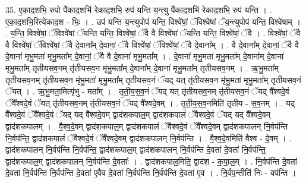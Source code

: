 \documentclass[17pt]{extarticle}
\begin{document}
35. ए॒का॒द॒शभि॒ रुपो पै॑काद॒शभि॑ रेकाद॒शभि॒ रुप॑ यन्ति य॒न्त्यु पै॑काद॒शभि॑ रेकाद॒शभि॒ रुप॑ यन्ति । . ए॒का॒द॒शभि॒रित्ये॑काद॒श - भिः॒ । . उप॑ यन्ति य॒न्त्युपोप॑ यन्ति॒ विश्वे॑षां॒ ॅविश्वे॑षां ॅय॒न्त्युपोप॑ यन्ति॒ विश्वे॑षाम् । . य॒न्ति॒ विश्वे॑षां॒ ॅविश्वे॑षां ॅयन्ति यन्ति॒ विश्वे॑षां॒ ॅवै वै विश्वे॑षां ॅयन्ति यन्ति॒ विश्वे॑षां॒ ॅवै । . विश्वे॑षां॒ ॅवै वै विश्वे॑षां॒ ॅविश्वे॑षां॒ ॅवै दे॒वाना᳚म् दे॒वानां॒ ॅवै विश्वे॑षां॒ ॅविश्वे॑षां॒ ॅवै दे॒वाना᳚म् । . वै दे॒वाना᳚म् दे॒वानां॒ ॅवै वै दे॒वाना॑ मृभु॒मता॑ मृभु॒मता᳚म् दे॒वानां॒ ॅवै वै दे॒वाना॑ मृभु॒मता᳚म् । . दे॒वाना॑ मृभु॒मता॑ मृभु॒मता᳚म् दे॒वाना᳚म् दे॒वाना॑ मृभु॒मता᳚म् तृतीयसव॒नम् तृ॑तीयसव॒न मृ॑भु॒मता᳚म् दे॒वाना᳚म् दे॒वाना॑ मृभु॒मता᳚म् तृतीयसव॒नम् । . ऋ॒भु॒मता᳚म् तृतीयसव॒नम् तृ॑तीयसव॒न मृ॑भु॒मता॑ मृभु॒मता᳚म् तृतीयसव॒नं ॅयद् यत् तृ॑तीयसव॒न मृ॑भु॒मता॑ मृभु॒मता᳚म् तृतीयसव॒नं ॅयत् । . ऋ॒भु॒मता॒मित्यृ॑भु - मता᳚म् । . तृ॒ती॒य॒स॒व॒नं ॅयद् यत् तृ॑तीयसव॒नम् तृ॑तीयसव॒नं ॅयद् वै᳚श्वदे॒वं ॅवै᳚श्वदे॒वं ॅयत् तृ॑तीयसव॒नम् तृ॑तीयसव॒नं ॅयद् वै᳚श्वदे॒वम् । . तृ॒ती॒य॒स॒व॒नमिति॑ तृतीय - स॒व॒नम् । . यद् वै᳚श्वदे॒वं ॅवै᳚श्वदे॒वं ॅयद् यद् वै᳚श्वदे॒वम् द्वाद॑शकपाल॒म् द्वाद॑शकपालं ॅवैश्वदे॒वं ॅयद् यद् वै᳚श्वदे॒वम् द्वाद॑शकपालम् । . वै॒श्व॒दे॒वम् द्वाद॑शकपाल॒म् द्वाद॑शकपालं ॅवैश्वदे॒वं ॅवै᳚श्वदे॒वम् द्वाद॑शकपालन् नि॒र्वप॑न्ति नि॒र्वप॑न्ति॒ द्वाद॑शकपालं ॅवैश्वदे॒वं ॅवै᳚श्वदे॒वम् द्वाद॑शकपालन् नि॒र्वप॑न्ति । . वै॒श्व॒दे॒वमिति॑ वैश्व - दे॒वम् । . द्वाद॑शकपालन् नि॒र्वप॑न्ति नि॒र्वप॑न्ति॒ द्वाद॑शकपाल॒म् द्वाद॑शकपालन् नि॒र्वप॑न्ति दे॒वता॑ दे॒वता॑ नि॒र्वप॑न्ति॒ द्वाद॑शकपाल॒म् द्वाद॑शकपालन् नि॒र्वप॑न्ति दे॒वताः᳚ । . द्वाद॑शकपाल॒मिति॒ द्वाद॑श - क॒पा॒ल॒म् । . नि॒र्वप॑न्ति दे॒वता॑ दे॒वता॑ नि॒र्वप॑न्ति नि॒र्वप॑न्ति दे॒वता॑ ए॒वैव दे॒वता॑ नि॒र्वप॑न्ति नि॒र्वप॑न्ति दे॒वता॑ ए॒व । . नि॒र्वप॒न्तीति॑ निः - वप॑न्ति । \newline
\end{document}
